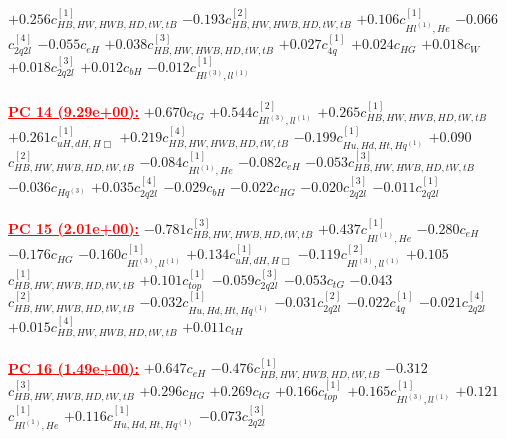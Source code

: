 \documentclass{article}
\begin{document}
{$+0.256$}{\rm $c_{HB,HW,HWB,HD,tW,tB}^{[1]}$} 
{$-0.193$}{\rm $c_{HB,HW,HWB,HD,tW,tB}^{[2]}$} 
{$+0.106$}{\rm $c_{Hl^{(1)},He}^{[1]}$} 
{$-0.066$}{\rm $c_{2q2l}^{[4]}$} 
{$-0.055$}{\rm $c_{eH}$} 
{$+0.038$}{\rm $c_{HB,HW,HWB,HD,tW,tB}^{[3]}$} 
{$+0.027$}{\rm $c_{4q}^{[1]}$} 
{$+0.024$}{\rm $c_{HG}$} 
{$+0.018$}{\rm $c_{W}$} 
{$+0.018$}{\rm $c_{2q2l}^{[3]}$} 
{$+0.012$}{\rm $c_{bH}$} 
{$-0.012$}{\rm $c_{Hl^{(3)},ll^{(1)}}^{[1]}$} 
 \nonumber \\ \nonumber \\ 
\noindent \textcolor{red}{\underline{\bf{PC 14} (9.29e+00):}}
{$+0.670$}{\rm $c_{tG}$} 
{$+0.544$}{\rm $c_{Hl^{(3)},ll^{(1)}}^{[2]}$} 
{$+0.265$}{\rm $c_{HB,HW,HWB,HD,tW,tB}^{[1]}$} 
{$+0.261$}{\rm $c_{uH,dH,H\Box}^{[1]}$} 
{$+0.219$}{\rm $c_{HB,HW,HWB,HD,tW,tB}^{[4]}$} 
{$-0.199$}{\rm $c_{Hu,Hd,Ht,Hq^{(1)}}^{[1]}$} 
{$+0.090$}{\rm $c_{HB,HW,HWB,HD,tW,tB}^{[2]}$} 
{$-0.084$}{\rm $c_{Hl^{(1)},He}^{[1]}$} 
{$-0.082$}{\rm $c_{eH}$} 
{$-0.053$}{\rm $c_{HB,HW,HWB,HD,tW,tB}^{[3]}$} 
{$-0.036$}{\rm $c_{Hq^(3)}$} 
{$+0.035$}{\rm $c_{2q2l}^{[4]}$} 
{$-0.029$}{\rm $c_{bH}$} 
{$-0.022$}{\rm $c_{HG}$} 
{$-0.020$}{\rm $c_{2q2l}^{[3]}$} 
{$-0.011$}{\rm $c_{2q2l}^{[1]}$} 
 \nonumber \\ \nonumber \\ 
\noindent \textcolor{red}{\underline{\bf{PC 15} (2.01e+00):}}
{$-0.781$}{\rm $c_{HB,HW,HWB,HD,tW,tB}^{[3]}$} 
{$+0.437$}{\rm $c_{Hl^{(1)},He}^{[1]}$} 
{$-0.280$}{\rm $c_{eH}$} 
{$-0.176$}{\rm $c_{HG}$} 
{$-0.160$}{\rm $c_{Hl^{(3)},ll^{(1)}}^{[1]}$} 
{$+0.134$}{\rm $c_{uH,dH,H\Box}^{[1]}$} 
{$-0.119$}{\rm $c_{Hl^{(3)},ll^{(1)}}^{[2]}$} 
{$+0.105$}{\rm $c_{HB,HW,HWB,HD,tW,tB}^{[1]}$} 
{$+0.101$}{\rm $c_{top}^{[1]}$} 
{$-0.059$}{\rm $c_{2q2l}^{[3]}$} 
{$-0.053$}{\rm $c_{tG}$} 
{$-0.043$}{\rm $c_{HB,HW,HWB,HD,tW,tB}^{[2]}$} 
{$-0.032$}{\rm $c_{Hu,Hd,Ht,Hq^{(1)}}^{[1]}$} 
{$-0.031$}{\rm $c_{2q2l}^{[2]}$} 
{$-0.022$}{\rm $c_{4q}^{[1]}$} 
{$-0.021$}{\rm $c_{2q2l}^{[4]}$} 
{$+0.015$}{\rm $c_{HB,HW,HWB,HD,tW,tB}^{[4]}$} 
{$+0.011$}{\rm $c_{tH}$} 
 \nonumber \\ \nonumber \\ 
\noindent \textcolor{red}{\underline{\bf{PC 16} (1.49e+00):}}
{$+0.647$}{\rm $c_{eH}$} 
{$-0.476$}{\rm $c_{HB,HW,HWB,HD,tW,tB}^{[1]}$} 
{$-0.312$}{\rm $c_{HB,HW,HWB,HD,tW,tB}^{[3]}$} 
{$+0.296$}{\rm $c_{HG}$} 
{$+0.269$}{\rm $c_{tG}$} 
{$+0.166$}{\rm $c_{top}^{[1]}$} 
{$+0.165$}{\rm $c_{Hl^{(3)},ll^{(1)}}^{[1]}$} 
{$+0.121$}{\rm $c_{Hl^{(1)},He}^{[1]}$} 
{$+0.116$}{\rm $c_{Hu,Hd,Ht,Hq^{(1)}}^{[1]}$} 
{$-0.073$}{\rm $c_{2q2l}^{[3]}$} 
\end{document}
